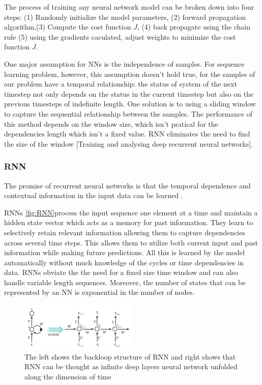 \documentclass[5p]{elsarticle}
\begin{document}
The process of training any neural network model can be broken down into four steps: (1) Randomly initialize the model parameters, (2) forward propagation algorithm,(3) Compute the cost function $J$, (4) back propagate using the chain rule  (5) using the gradients caculated, adjust weights to minimize the cost function $J$.

One major assumption for NNs is the independence of samples. For sequence learning problem, however, this assumption doesn't hold true, for the samples of our problem have a temporal relationship: the status of system of the next timestep not only depends on the status in the current timestep but also on the previous timesteps of indefinite length. One solution is to using a sliding window to capture the sequential relationship between the samples. The performance of this method depends on the window size, which isn't pratical for the dependencies length which isn't a fixed value. RNN eliminates the need to find the size of the window [Training and analysing deep recurrent neural networks]. 

\subsubsection{RNN}
The promise of recurrent neural networks is that the temporal dependence and contextual
information in the input data can be learned\cite{Bengio1994LearningDifficult} \cite{ChoLearningTranslation}. 

RNNs \ref{fig:RNN}process the input sequence one element at a time and maintain a hidden
state vector which acts as a memory for past information. They learn to selectively retain relevant information allowing them to capture dependencies across several time steps. This allows them to utilize both current input and past information while making future predictions. All this is learned by the model automatically without much knowledge of the cycles or time dependencies in data. RNNs obviate the the need for a fixed size time window and can also handle variable length sequences. Moreover, the number of states that can be represented by an NN is exponential in the number of nodes.

 
\begin{figure}[h]
    \centering
    \includegraphics[width=0.5\textwidth]{RNN.png}
    \caption{The left shows the backloop structure of RNN and right shows that RNN can be thought as infinite deep layers neural network unfolded along the dimension of time}
    \label{fig:RNN can be thought as infinite deep layers neural network along the dimensions of time}
\end{figure}
\end{document}

